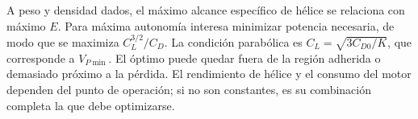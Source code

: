 A peso y densidad dados, el máximo alcance específico de hélice se relaciona con máximo $E$. Para máxima autonomía interesa minimizar potencia necesaria, de modo que se maximiza $C_L^{3/2}/C_D$. La condición parabólica es $C_L=\sqrt{3C_{D0}/K}$, que corresponde a $V_{P\min}$. El óptimo puede quedar fuera de la región adherida o demasiado próximo a la pérdida. El rendimiento de hélice y el consumo del motor dependen del punto de operación; si no son constantes, es su combinación completa la que debe optimizarse.


